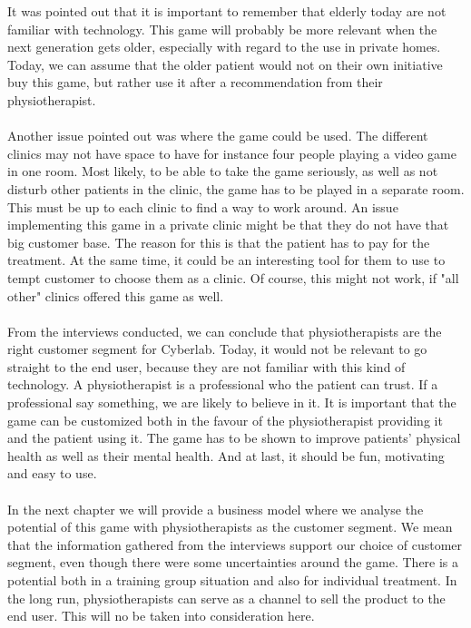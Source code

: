 It was pointed out that it is important to remember that elderly today are not familiar with technology. This game will probably be more relevant when the next generation gets older, especially with regard to the use in private homes. Today, we can assume that the older patient would not on their own initiative buy this game, but rather use it after a recommendation from their physiotherapist. \\ \\
Another issue pointed out was where the game could be used. The different clinics may not have space to have for instance four people playing a video game in one room. Most likely, to be able to take the game seriously, as well as not disturb other patients in the clinic, the game has to be played in a separate room. This must be up to each clinic to find a way to work around. An issue implementing this game in a private clinic might be that they do not have that big customer base. The reason for this is that the patient has to pay for the treatment. At the same time, it could be an interesting tool for them to use to tempt customer to choose them as a clinic. Of course, this might not work, if "all other" clinics offered this game as well. \\ \\
From the interviews conducted, we can conclude that physiotherapists are the right customer segment for Cyberlab. Today, it would not be relevant to go straight to the end user, because they are not familiar with this kind of technology. A physiotherapist is a professional who the patient can trust. If a professional say something, we are likely to believe in it.  It is important that the game can be customized both in the favour of the physiotherapist providing it and the patient using it. The game has to be shown to improve patients' physical health as well as their mental health. And at last, it should be fun, motivating and easy to use. \\ \\
In the next chapter we will provide a business model where we analyse the potential of this game with physiotherapists as the customer segment. We mean that the information gathered from the interviews support our choice of customer segment, even though there were some uncertainties around the game. There is a potential both in a training group situation and also for individual treatment. In the long run, physiotherapists can serve as a channel to sell the product to the end user. This will no be taken into consideration here. 
